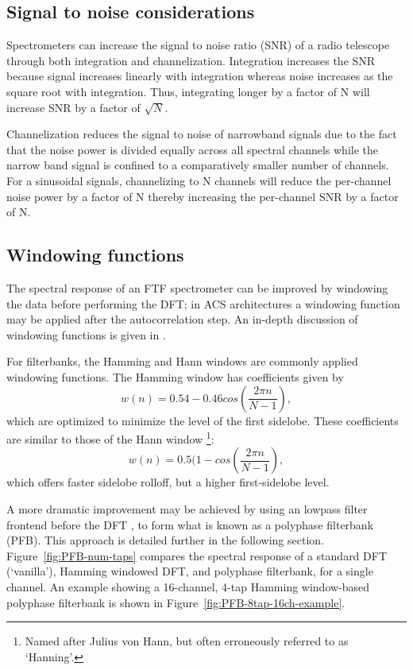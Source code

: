 \documentclass{ws-rv961x669}
\begin{document}
\subsection{Signal to noise considerations}

Spectrometers can increase the signal to noise ratio (SNR) of a radio telescope through both integration and channelization. Integration increases the SNR because signal increases linearly with integration whereas noise increases as the square root with integration. Thus, integrating longer by a factor of N will increase SNR by a factor of $\sqrt{N}$.

Channelization reduces the signal to noise of narrowband signals due to the fact that the noise power is divided equally across all spectral channels while the narrow band signal is confined to a comparatively smaller number of channels. For a sinusoidal signals, channelizing to N channels will reduce the per-channel noise power by a factor of N thereby increasing the per-channel SNR by a factor of N.





\subsection{Windowing functions}

The spectral response of an FTF spectrometer can be improved by windowing
the data before performing the DFT; in ACS architectures a windowing
function may be applied after the autocorrelation step. An in-depth
discussion of windowing functions is given in \citet{SvenGade1987}. 

For filterbanks, the Hamming and Hann windows are commonly applied
windowing functions. The Hamming window has coefficients given by
\begin{equation}
w(n)=\mbox{0.54}-\mbox{0.46}cos\left(\frac{\mbox{2}\pi n}{N-1}\right),
\end{equation}
which are optimized to minimize the level of the first sidelobe. These
coefficients are similar to those of the Hann window%
\footnote{Named after Julius von Hann, but often erroneously referred to as
`Hanning'.%
}:
\begin{equation}
w(n)=\mbox{0.5}(\mbox{1}-cos\left(\frac{\mbox{2}\pi n}{N-1}\right),
\end{equation}
which offers faster sidelobe rolloff, but a higher first-sidelobe
level. 

A more dramatic improvement may be achieved by using an lowpass filter
frontend before the DFT \citep{Bellanger:1976p7898}, to form what
is known as a polyphase filterbank (PFB). This approach is detailed
further in the following section. Figure~\ref{fig:PFB-num-taps}
compares the spectral response of a standard DFT (`vanilla'), Hamming
windowed DFT, and polyphase filterbank, for a single channel. An example
showing a 16-channel, 4-tap Hamming window-based polyphase filterbank
is shown in Figure~\ref{fig:PFB-8tap-16ch-example}.
\end{document}

